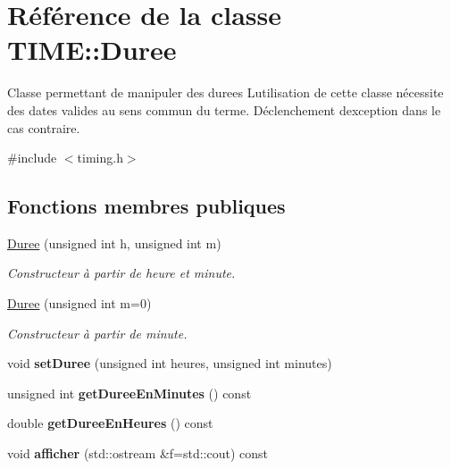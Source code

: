 \hypertarget{class_t_i_m_e_1_1_duree}{}\section{Référence de la classe T\+I\+M\+E\+:\+:Duree}
\label{class_t_i_m_e_1_1_duree}


Classe permettant de manipuler des durees L\textquotesingle{}utilisation de cette classe nécessite des dates valides au sens commun du terme. Déclenchement d\textquotesingle{}exception dans le cas contraire.  




{\ttfamily \#include $<$timing.\+h$>$}

\subsection*{Fonctions membres publiques}
\begin{DoxyCompactItemize}
\item 
\hyperlink{class_t_i_m_e_1_1_duree_ae0532a0d60dbc31773f038967dfe220e}{Duree} (unsigned int h, unsigned int m)
\begin{DoxyCompactList}\small\item\em Constructeur à partir de heure et minute. \end{DoxyCompactList}\item 
\hyperlink{class_t_i_m_e_1_1_duree_a0f99878e52fad2f9e0643301c70d9ef7}{Duree} (unsigned int m=0)
\begin{DoxyCompactList}\small\item\em Constructeur à partir de minute. \end{DoxyCompactList}\item 
\hypertarget{class_t_i_m_e_1_1_duree_aabba3e357861f21faa8419339f7b7176}{}void {\bfseries set\+Duree} (unsigned int heures, unsigned int minutes)\label{class_t_i_m_e_1_1_duree_aabba3e357861f21faa8419339f7b7176}

\item 
\hypertarget{class_t_i_m_e_1_1_duree_a1e47fb5f0734ec562e2f9dba32db45f4}{}unsigned int {\bfseries get\+Duree\+En\+Minutes} () const \label{class_t_i_m_e_1_1_duree_a1e47fb5f0734ec562e2f9dba32db45f4}

\item 
\hypertarget{class_t_i_m_e_1_1_duree_afb11d106fc1f6761a68f486dc7a17564}{}double {\bfseries get\+Duree\+En\+Heures} () const \label{class_t_i_m_e_1_1_duree_afb11d106fc1f6761a68f486dc7a17564}

\item 
\hypertarget{class_t_i_m_e_1_1_duree_ad957a58f8bc103857f3e494bab5f60e1}{}void {\bfseries afficher} (std\+::ostream \&f=std\+::cout) const \label{class_t_i_m_e_1_1_duree_ad957a58f8bc103857f3e494bab5f60e1}

\end{DoxyCompactItemize}


